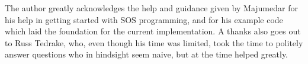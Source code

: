 \documentclass[journal,
transmag,
hidelinks]{IEEEtran}
\newcommand{\0}{\mathbf{0}}
\newcommand{\1}{\mathbf{1}}
\begin{document}
The author greatly acknowledges the help and guidance given by Majumedar for his
help in getting started with SOS programming, and for his example code which
laid the foundation for the current implementation. A thanks also goes out to
Russ Tedrake, who, even though his time was limited, took the time to politely
answer questions who in hindsight seem naive, but at the time helped greatly.


\ifCLASSOPTIONcaptionsoff
  \newpage
\fi







%



% 
\end{document}
